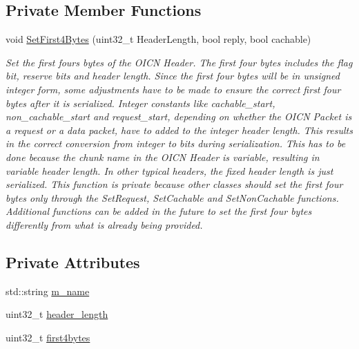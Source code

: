 \subsection*{Private Member Functions}
\begin{DoxyCompactItemize}
\item 
void \hyperlink{classns3_1_1OICNHeader_a0f1fbd0fe1a317a25cb6583165505c50}{Set\-First4\-Bytes} (uint32\-\_\-t Header\-Length, bool reply, bool cachable)
\begin{DoxyCompactList}\small\item\em Set the first fours bytes of the O\-I\-C\-N Header. The first four bytes includes the flag bit, reserve bits and header length. Since the first four bytes will be in unsigned integer form, some adjustments have to be made to ensure the correct first four bytes after it is serialized. Integer constants like cachable\-\_\-start, non\-\_\-cachable\-\_\-start and request\-\_\-start, depending on whether the O\-I\-C\-N Packet is a request or a data packet, have to added to the integer header length. This results in the correct conversion from integer to bits during serialization. This has to be done because the chunk name in the O\-I\-C\-N Header is variable, resulting in variable header length. In other typical headers, the fixed header length is just serialized. This function is private because other classes should set the first four bytes only through the Set\-Request, Set\-Cachable and Set\-Non\-Cachable functions. Additional functions can be added in the future to set the first four bytes differently from what is already being provided. \end{DoxyCompactList}\end{DoxyCompactItemize}
\subsection*{Private Attributes}
\begin{DoxyCompactItemize}
\item 
std\-::string \hyperlink{classns3_1_1OICNHeader_aeae9c3bd12d464c8735c94c144043532}{m\-\_\-name}
\item 
uint32\-\_\-t \hyperlink{classns3_1_1OICNHeader_ac92ae7083ec2a8f545015cdccce547f2}{header\-\_\-length}
\item 
uint32\-\_\-t \hyperlink{classns3_1_1OICNHeader_aed81d3b46c1f8b233bf0bfd15bb181fa}{first4bytes}
\end{DoxyCompactItemize}
